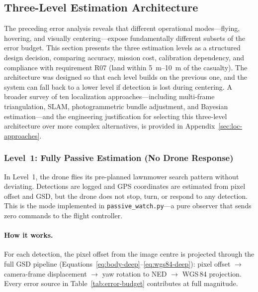 \subsection{Three-Level Estimation Architecture}\label{sec:three-strategies}

The preceding error analysis reveals that different operational modes---flying, hovering, and visually centering---expose fundamentally different subsets of the error budget.  This section presents the three estimation levels as a structured design decision, comparing accuracy, mission cost, calibration dependency, and compliance with requirement R07 (land within \SIrange{5}{10}{\metre} of the casualty).  The architecture was designed so that each level builds on the previous one, and the system can fall back to a lower level if detection is lost during centering.  A broader survey of ten localization approaches---including multi-frame triangulation, SLAM, photogrammetric bundle adjustment, and Bayesian estimation---and the engineering justification for selecting this three-level architecture over more complex alternatives, is provided in Appendix~\ref{sec:loc-approaches}.

\subsubsection{Level~1: Fully Passive Estimation (No Drone Response)}\label{sec:level-1-passive}

In Level~1, the drone flies its pre-planned lawnmower search pattern without deviating.  Detections are logged and GPS coordinates are estimated from pixel offset and GSD, but the drone does not stop, turn, or respond to any detection.  This is the mode implemented in \texttt{passive\_watch.py}---a pure observer that sends zero commands to the flight controller.

\paragraph{How it works.}  For each detection, the pixel offset from the image centre is projected through the full GSD pipeline (Equations~\ref{eq:body-deep}--\ref{eq:wgs84-deep}): pixel offset $\to$ camera-frame displacement $\to$ yaw rotation to NED $\to$ WGS\,84 projection.  Every error source in Table~\ref{tab:error-budget} contributes at full magnitude.


